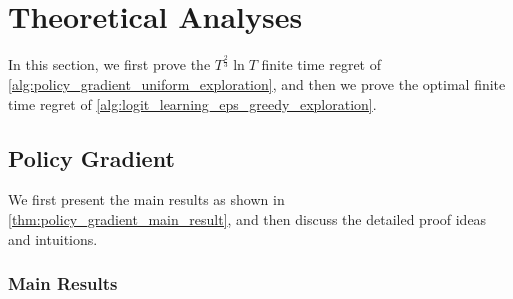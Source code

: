 \section{Theoretical Analyses}
\label{sec:theoretical_analyses}

In this section, we first prove the $T^{\frac{2}{3}}\ln{T}$ finite time regret of \cref{alg:policy_gradient_uniform_exploration}, and then we prove the optimal finite time regret of \cref{alg:logit_learning_eps_greedy_exploration}.

\subsection{Policy Gradient}
\label{subsec:theoretical_analyses_policy_gradient}

We first present the main results as shown in \cref{thm:policy_gradient_main_result}, and then discuss the detailed proof ideas and intuitions.

\subsubsection{Main Results}
\label{subsubsec:main_results_policy_gradient}

